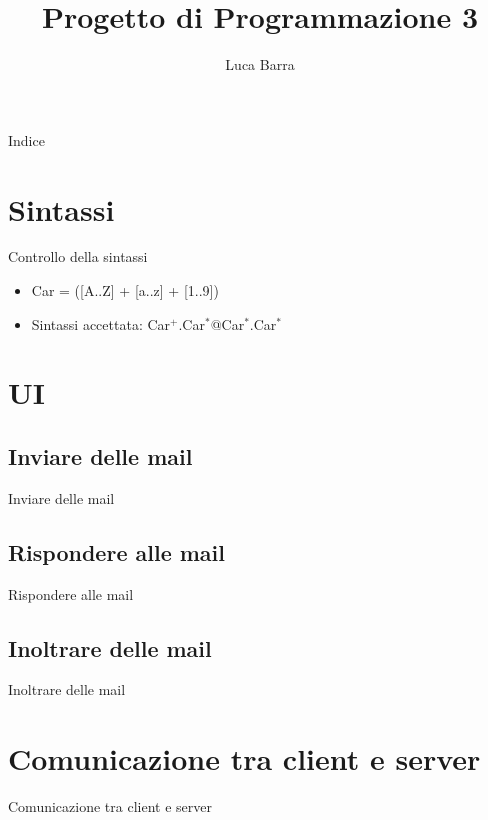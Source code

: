 \documentclass[14pt, aspectratio=169]{beamer}
\title{Progetto di Programmazione 3}
\author{Luca Barra}
\date{}
\begin{document}
\maketitle

\begin{frame}{Indice}
  \tableofcontents
\end{frame}

\section{Sintassi}

\begin{frame}{Controllo della sintassi}

  \begin{itemize}
    \item<1-> Car = ([A..Z] + [a..z] + [1..9])
    \item<2-> Sintassi accettata: Car$^+$.Car$^*$@Car$^*$.Car$^*$
  \end{itemize}

\end{frame}

\section{UI}

\subsection{Inviare delle mail}

\begin{frame}{Inviare delle mail}
  
\end{frame}

\subsection{Rispondere alle mail}

\begin{frame}{Rispondere alle mail}
  
\end{frame}

\subsection{Inoltrare delle mail}

\begin{frame}{Inoltrare delle mail}
  
\end{frame}

\section{Comunicazione tra client e server}

\begin{frame}{Comunicazione tra client e server}
  
\end{frame}
\end{document}
